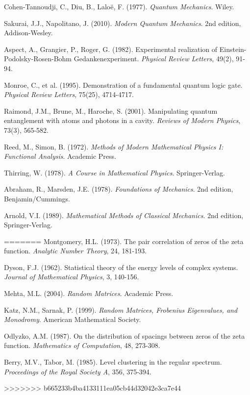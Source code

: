 \documentclass[12pt]{article}
\theoremstyle{plain}
\theoremstyle{definition}
\begin{document}
\begin{thebibliography}{99}
 Cohen-Tannoudji, C., Diu, B., Laloë, F. (1977). \emph{Quantum Mechanics}. Wiley.

 Sakurai, J.J., Napolitano, J. (2010). \emph{Modern Quantum Mechanics}. 2nd edition, Addison-Wesley.

 Aspect, A., Grangier, P., Roger, G. (1982). Experimental realization of Einstein-Podolsky-Rosen-Bohm Gedankenexperiment. \emph{Physical Review Letters}, 49(2), 91-94.

 Monroe, C., et al. (1995). Demonstration of a fundamental quantum logic gate. \emph{Physical Review Letters}, 75(25), 4714-4717.

 Raimond, J.M., Brune, M., Haroche, S. (2001). Manipulating quantum entanglement with atoms and photons in a cavity. \emph{Reviews of Modern Physics}, 73(3), 565-582.

 Reed, M., Simon, B. (1972). \emph{Methods of Modern Mathematical Physics I: Functional Analysis}. Academic Press.

 Thirring, W. (1978). \emph{A Course in Mathematical Physics}. Springer-Verlag.

 Abraham, R., Marsden, J.E. (1978). \emph{Foundations of Mechanics}. 2nd edition, Benjamin/Cummings.

 Arnold, V.I. (1989). \emph{Mathematical Methods of Classical Mechanics}. 2nd edition, Springer-Verlag.

=======
 Montgomery, H.L. (1973). The pair correlation of zeros of the zeta function. \emph{Analytic Number Theory}, 24, 181-193.

 Dyson, F.J. (1962). Statistical theory of the energy levels of complex systems. \emph{Journal of Mathematical Physics}, 3, 140-156.

 Mehta, M.L. (2004). \emph{Random Matrices}. Academic Press.

 Katz, N.M., Sarnak, P. (1999). \emph{Random Matrices, Frobenius Eigenvalues, and Monodromy}. American Mathematical Society.

 Odlyzko, A.M. (1987). On the distribution of spacings between zeros of the zeta function. \emph{Mathematics of Computation}, 48, 273-308.

 Berry, M.V., Tabor, M. (1985). Level clustering in the regular spectrum. \emph{Proceedings of the Royal Society A}, 356, 375-394.

>>>>>>> b665233b4ba4133111ea05cb44d32042e3ca7e44
\end{thebibliography}
\end{document}
